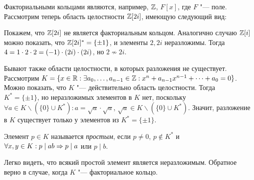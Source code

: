 \begin{example}
	Факториальными кольцами являются, например, $\mathbb{Z}$, $F[x]$, где $F$ "--- поле. Рассмотрим теперь область целостности $\mathbb{Z}[2i]$, имеющую следующий вид:
	\begin{center}
	\end{center}
	
	Покажем, что $\mathbb{Z}[2i]$ не является факториальным кольцом. Аналогично случаю $\mathbb{Z}[i]$ можно показать, что $\mathbb{Z}[2i]^* = \{\pm1\}$, и элементы $2, 2i$ неразложимы. Тогда $4 = 1 \cdot 2 \cdot 2 \hm= (-1)\cdot (2i) \cdot (2i)$, но $2 \not\sim 2i$.
\end{example}

\begin{note}
	Бывают также области целостности, в которых разложения не существует. Рассмотрим $K = \{x \in \mathbb{R}: \exists a_0, \dotsc, a_{n - 1} \in \mathbb{Z}: x^n + a_{n-1}x^{n-1} + \dotsb + a_0 = 0\}$. Можно показать, что $K$ "--- действительно область целостности. Тогда $K^* = \{\pm1\}$, но неразложимых элементов в $K$ нет, поскольку $\forall a \in K \backslash (\{0\} \cup K^*): a = \sqrt{a} \cdot \sqrt{a}$, $\sqrt{a} \in K \backslash (\{0\} \cup K^*)$. Значит, разложение в $K$ существует только у элементов из $K^* = \{\pm1\}$.
\end{note}

\begin{definition}
	Элемент $p \in K$ называется \textit{простым}, если $p \ne 0$, $p \not\in K^*$ и $\forall x, y \in K: p \mid ab \Rightarrow p \mid a$ или $p \mid b$.
\end{definition}

\begin{note}
	Легко видеть, что всякий простой элемент является неразложимым. Обратное верно в случае, когда $K$ "--- факториальное кольцо.
\end{note}

